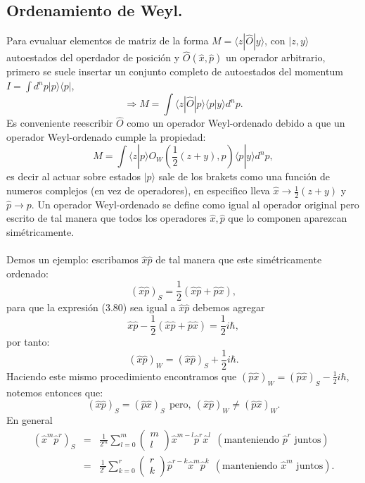 \subsection{Ordenamiento de Weyl.}
Para evualuar elementos de matriz de la forma $M=\langle z|\hat{O}|y\rangle$, con $|z,y\rangle $ autoestados del operdador de posición y $\hat{O}(\hat{x},\hat{p})$ un operador arbitrario, primero se suele insertar un conjunto completo de autoestados del momentum $I=\int d^np|p\rangle\langle p|$,
\begin{equation}
\Rightarrow M=\int\langle z|\hat{O}|p\rangle\langle p|y\rangle d^{n}p.
\end{equation}
Es conveniente reescribir $\hat{O}$ como un operador Weyl-ordenado debido a que un operador Weyl-ordenado cumple la propiedad:
\begin{equation}
M=\int\langle z|p\rangle O_{W}\left(\frac{1}{2}(z+y),p\right)\langle p|y\rangle d^{n}p,
\end{equation}
es decir al actuar sobre estados $|p\rangle$ sale de los brakets como una función de numeros complejos (en vez de operadores), en especifico lleva $\hat{x}\to \frac{1}{2}(z+y)$ y $\hat{p}\to p$. Un operador Weyl-ordenado se define como igual al operador original pero escrito de tal manera que todos los operadores $\hat{x},\hat{p}$ que lo componen aparezcan simétricamente. 
\\
\\
Demos un ejemplo: escribamos $\hat{x}\hat{p}$ de tal manera que este simétricamente ordenado:
\begin{equation}
(\hat{x}\hat{p})_S=\frac{1}{2}(\hat{x}\hat{p}+\hat{p}\hat{x}),
\end{equation}
para que la expresión (3.80) sea igual a $\hat{x}\hat{p}$ debemos agregar
\begin{equation}
\hat{x}\hat{p}-\frac{1}{2}(\hat{x}\hat{p}+\hat{p}\hat{x})=\frac{1}{2}i\hbar ,
\end{equation}
por tanto:
\begin{equation}
(\hat{x}\hat{p})_W=(\hat{x}\hat{p})_S+\frac{1}{2}i\hbar .
\end{equation}
Haciendo este mismo procedimiento encontramos que $(\hat{p}\hat{x})_W=(\hat{p}\hat{x})_S-\frac{1}{2}i\hbar$, notemos entonces que:
\begin{equation}
(\hat{x}\hat{p})_S=(\hat{p}\hat{x})_S \ \ \text{pero},\ (\hat{x}\hat{p})_W\neq(\hat{p}\hat{x})_W. 
\end{equation}
En general
\begin{eqnarray}
\nonumber (\hat{x}^{m}\hat{p}^{r})_{S}&=&\frac{1}{2^{m}}\sum_{l=0}^{m}\left(\begin{array}{c}
m\\
l
\end{array}\right)\hat{x}^{m-l}\hat{p}^{r}\hat{x}^{l}\ \ (\text{manteniendo $\hat{p}^r$ juntos})\\
&=& \frac{1}{2^{r}}\sum_{k=0}^{r}\left(\begin{array}{c}
r\\
k
\end{array}\right)\hat{p}^{r-k}\hat{x}^{m}\hat{p}^{k} \ \ (\text{manteniendo $\hat{x}^m$ juntos}).
\end{eqnarray}
